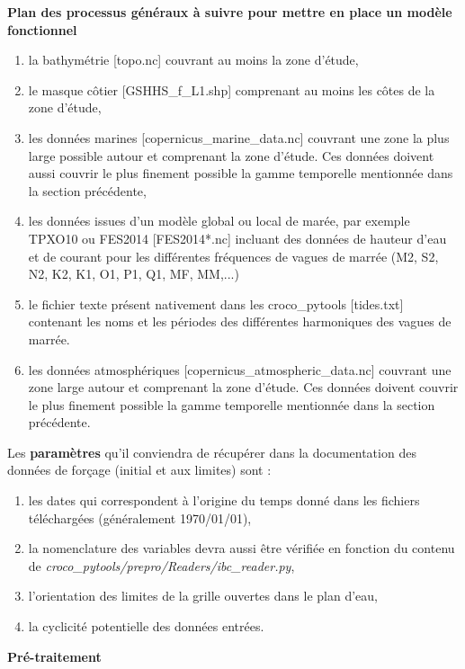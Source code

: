 \documentclass[10pt,a4paper,titlepage]{article}
\begin{document}
\begin{processEnv}{\textbf{Plan des processus généraux à suivre pour mettre en place un modèle fonctionnel}}
    \begin{enumerate}
        \item la bathymétrie {\color{darkgrey}[topo.nc]} couvrant au moins la zone d'étude,
        \item le masque côtier {\color{darkgrey}[GSHHS\_f\_L1.shp]} comprenant au moins les côtes de la zone d'étude,
        \item les données marines {\color{darkgrey}[copernicus\_marine\_data.nc]} couvrant une zone la plus large possible autour et comprenant la zone d'étude. Ces données doivent aussi couvrir le plus finement possible la gamme temporelle mentionnée dans la section précédente,
        \item les données issues d'un modèle global ou local de marée, par exemple TPXO10 ou FES2014 {\color{darkgrey}[FES2014*.nc]} incluant des données de hauteur d'eau et de courant pour les différentes fréquences de vagues de marrée (M2, S2, N2, K2, K1, O1, P1, Q1, MF, MM,...)
        \item le fichier texte présent nativement dans les croco\_pytools {\color{darkgrey}[tides.txt]} contenant les noms et les périodes des différentes harmoniques des vagues de marrée.
        \item les données atmosphériques {\color{darkgrey}[copernicus\_atmospheric\_data.nc]} couvrant une zone large autour et comprenant la zone d'étude. Ces données doivent couvrir le plus finement possible la gamme temporelle mentionnée dans la section précédente.
    \end{enumerate}

    Les {\color{paramColor}\textbf{paramètres}} qu'il conviendra de récupérer dans la documentation des données de forçage (initial et aux limites) sont :

    \begin{enumerate}
        \item les dates qui correspondent à l'origine du temps donné dans les fichiers téléchargées (généralement 1970/01/01),
        \item la nomenclature des variables devra aussi être vérifiée en fonction du contenu de \textit{croco\_pytools/prepro/Readers/ibc\_reader.py},
        \item l'orientation des limites de la grille ouvertes dans le plan d'eau,
        \item la cyclicité potentielle des données entrées.
    \end{enumerate}

    {\color{workColor}\textbf{Pré-traitement}}


\end{processEnv}
\end{document}
